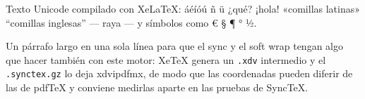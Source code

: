 \documentclass[11pt]{article}
\begin{document}
Texto Unicode compilado con XeLaTeX: áéíóú ñ ü ¿qué? ¡hola! «comillas latinas» “comillas inglesas” — raya — y símbolos como € § ¶ ° ½.

Un párrafo largo en una sola línea para que el sync y el soft wrap tengan algo que hacer también con este motor: XeTeX genera un \texttt{.xdv} intermedio y el \texttt{.synctex.gz} lo deja xdvipdfmx, de modo que las coordenadas pueden diferir de las de pdfTeX y conviene medirlas aparte en las pruebas de SyncTeX.
\end{document}
